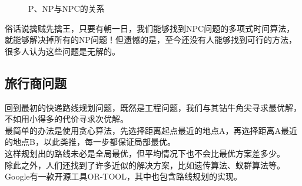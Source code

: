 \begin{figure}[H]
    \centering
    \caption{P、NP与NPC的关系}
\end{figure}

俗话说擒贼先擒王，只要有朝一日，我们能够找到NPC问题的多项式时间算法，就能够解决掉所有的NP问题！但遗憾的是，至今还没有人能够找到可行的方法，很多人认为这些问题是无解的。

\subsection{旅行商问题}

回到最初的快递路线规划问题，既然是工程问题，我们与其钻牛角尖寻求最优解，不如用小得多的代价寻求次优解。 \\

最简单的办法是使用贪心算法，先选择距离起点最近的地点A，再选择距离A最近的地点B，以此类推，每一步都保证局部最优。 \\

这样规划出的路线未必是全局最优，但平均情况下也不会比最优方案差多少。 \\

除此之外，人们还找到了许多近似的解决方案，比如遗传算法、蚁群算法等。Google有一款开源工具OR-TOOL，其中也包含路线规划的实现。

\newpage